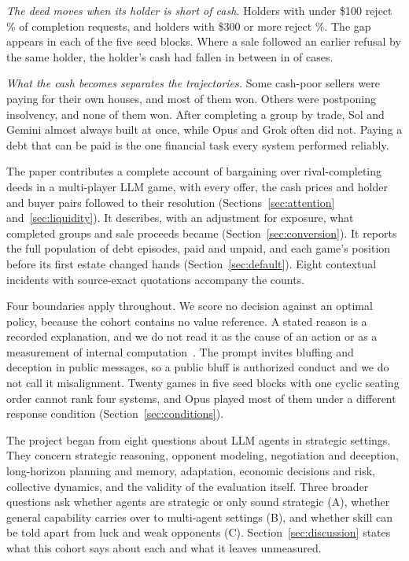 \emph{The deed moves when its holder is short of cash.} Holders with under \$100 reject \% of completion requests, and holders with \$300 or more reject \%. The gap appears in each of the five seed blocks. Where a sale followed an earlier refusal by the same holder, the holder's cash had fallen in between in  of  cases.

\emph{What the cash becomes separates the trajectories.} Some cash-poor sellers were paying for their own houses, and most of them won. Others were postponing insolvency, and none of them won. After completing a group by trade, Sol and Gemini almost always built at once, while Opus and Grok often did not. Paying a debt that can be paid is the one financial task every system performed reliably.

The paper contributes a complete account of bargaining over rival-completing deeds in a multi-player LLM game, with every offer, the cash prices and  holder and buyer pairs followed to their resolution (Sections~\ref{sec:attention} and~\ref{sec:liquidity}). It describes, with an adjustment for exposure, what completed groups and sale proceeds became (Section~\ref{sec:conversion}). It reports the full population of debt episodes, paid and unpaid, and each game's position before its first estate changed hands (Section~\ref{sec:default}). Eight contextual incidents with source-exact quotations accompany the counts.

Four boundaries apply throughout. We score no decision against an optimal policy, because the cohort contains no value reference. A stated reason is a recorded explanation, and we do not read it as the cause of an action or as a measurement of internal computation~\cite{turpin2023unfaithful,lanham2023faithfulness}. The prompt invites bluffing and deception in public messages, so a public bluff is authorized conduct and we do not call it misalignment. Twenty games in five seed blocks with one cyclic seating order cannot rank four systems, and Opus played most of them under a different response condition (Section~\ref{sec:conditions}).

The project began from eight questions about LLM agents in strategic settings. They concern strategic reasoning, opponent modeling, negotiation and deception, long-horizon planning and memory, adaptation, economic decisions and risk, collective dynamics, and the validity of the evaluation itself. Three broader questions ask whether agents are strategic or only sound strategic (A), whether general capability carries over to multi-agent settings (B), and whether skill can be told apart from luck and weak opponents (C). Section~\ref{sec:discussion} states what this cohort says about each and what it leaves unmeasured.
